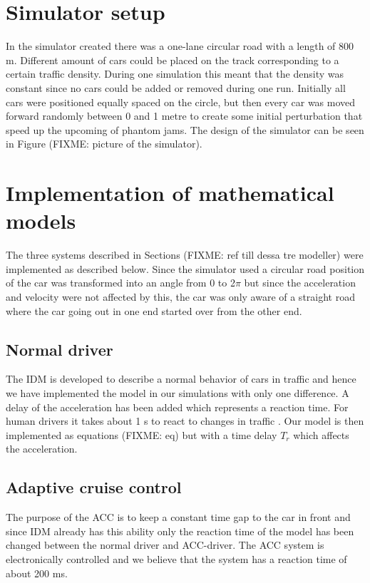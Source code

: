 \section{Simulator setup}
In the simulator created there was a one-lane circular road with a length of 800 m. Different amount of cars could be placed on the track corresponding to a certain traffic density. During one simulation this meant that the density was constant since no cars could be added or removed during one run. Initially all cars were positioned equally spaced on the circle, but then every car was moved forward randomly between 0 and 1 metre to create some initial perturbation that speed up the upcoming of phantom jams. The design of the simulator can be seen in Figure (FIXME: picture of the simulator).

\section{Implementation of mathematical models}
The three systems described in Sections (FIXME: ref till dessa tre modeller) were implemented as described below. Since the simulator used a circular road position of the car was transformed into an angle from 0 to 2\begin{math}\pi\end{math} but since the acceleration and velocity were not affected by this, the car was only aware of a straight road where the car going out in one end started over from the other end.

\subsection {Normal driver}
The IDM is developed to describe a normal behavior of cars in traffic and hence we have implemented the model in our simulations with only one difference. A delay of the acceleration has been added which represents a reaction time. For human drivers it takes about 1 s to react to changes in traffic \cite{idm}. Our model is then implemented as equations (FIXME: eq) but with a time delay \begin{math}T_r\end{math} which affects the acceleration.

\subsection {Adaptive cruise control }
The purpose of the ACC is to keep a constant time gap to the car in front and since IDM already has this ability only the reaction time of the model has been changed between the normal driver and ACC-driver. The ACC system is electronically controlled and we believe that the system has a reaction time of about 200 ms.

